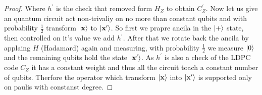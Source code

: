 \documentclass[manuscript,screen,review]{acmart}
\begin{document}
\begin{proof}
Where $h^{\prime}$ is the check that removed form $H_{Z}$ to obtain $C_{Z}^{\prime}$. Now let us give an quantum circuit act non-trivaliy on no more than constant qubits and with probability $\frac{1}{2}$ transform $\ket{\mathbf{x}}$ to $ \ket{\mathbf{x}^{\prime}}$. So first we prapre ancila in the $\ket{+}$ state, then controlled on it's value we add $h^{\prime}$. After that we rotate back the ancila by applaing $H$ (Hadamard) again and measuring, with probability $\frac{1}{2}$ we measure $\ket{0}$ and the remaining qubits hold the state $\ket{\mathbf{x}^{\prime}}$. As $h^{\prime}$ is also a check of the LDPC code $C_{Z}$ it has a constant weight and thus all the circuit toach a constant number of qubits. Therfore the operator which transform $\ket{\mathbf{x}}$ into $\ket{\mathbf{x}^{\prime}}$ is supported only on paulis with constanst degree.     
  \end{proof}


% 

\printbibliography
\end{document}
